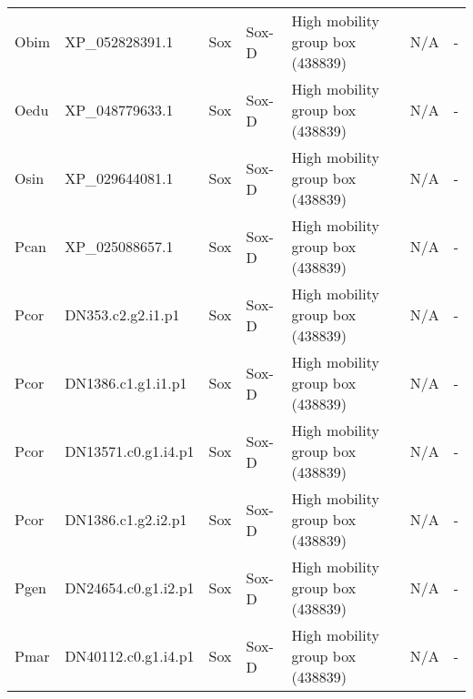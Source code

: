 \documentclass[../main.tex]{subfiles}
\begin{document}
\begin{landscape}
\begin{longtable}{lllllll}
		Obim           & XP\_052828391.1       & Sox            & Sox-D               & High mobility group box (438839)            & N/A                                                                    & -                    \\
		Oedu           & XP\_048779633.1       & Sox            & Sox-D               & High mobility group box (438839)            & N/A                                                                    & -                    \\
		Osin           & XP\_029644081.1       & Sox            & Sox-D               & High mobility group box (438839)            & N/A                                                                    & -                    \\
		Pcan           & XP\_025088657.1       & Sox            & Sox-D               & High mobility group box (438839)            & N/A                                                                    & -                    \\
		Pcor           & DN353.c2.g2.i1.p1     & Sox            & Sox-D               & High mobility group box (438839)            & N/A                                                                    & -                    \\
		Pcor           & DN1386.c1.g1.i1.p1    & Sox            & Sox-D               & High mobility group box (438839)            & N/A                                                                    & -                    \\
		Pcor           & DN13571.c0.g1.i4.p1   & Sox            & Sox-D               & High mobility group box (438839)            & N/A                                                                    & -                    \\
		Pcor           & DN1386.c1.g2.i2.p1    & Sox            & Sox-D               & High mobility group box (438839)            & N/A                                                                    & -                    \\
		Pgen           & DN24654.c0.g1.i2.p1   & Sox            & Sox-D               & High mobility group box (438839)            & N/A                                                                    & -                    \\
		Pmar           & DN40112.c0.g1.i4.p1   & Sox            & Sox-D               & High mobility group box (438839)            & N/A                                                                    & -                    \\

\end{longtable}
\end{landscape}
\end{document}
